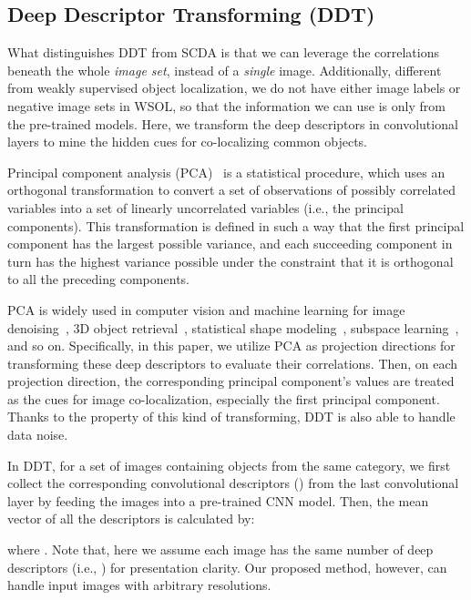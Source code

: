 \documentclass[twocolumn]{svjour3}          \smartqed  \usepackage{graphicx}
\begin{document}
\subsection{Deep Descriptor Transforming (DDT)}

What distinguishes DDT from SCDA is that we can leverage the correlations beneath the whole \emph{image set}, instead of a \emph{single} image. Additionally, different from weakly supervised object localization, we do not have either image labels or negative image sets in WSOL, so that the information we can use is only from the pre-trained models. Here, we transform the deep descriptors in convolutional layers to mine the hidden cues for co-localizing common objects.

Principal component analysis (PCA)~\citep{pca1901} is a statistical procedure, which uses an orthogonal transformation to convert a set of observations of possibly correlated variables into a set of linearly uncorrelated variables (i.e., the principal components). This transformation is defined in such a way that the first principal component has the largest possible variance, and each succeeding component in turn has the highest variance possible under the constraint that it is orthogonal to all the preceding components.

PCA is widely used in computer vision and machine learning for image denoising~\citep{stereijcv2017}, 3D object retrieval~\citep{3dijcv2011}, statistical shape modeling~\citep{shellpcaiccv2015}, subspace learning~\citep{videosubsijcv2013,subsijcv2003}, and so on. Specifically, in this paper, we utilize PCA as projection directions for transforming these deep descriptors  to evaluate their correlations. Then, on each projection direction, the corresponding principal component's values are treated as the cues for image co-localization, especially the first principal component. Thanks to the property of this kind of transforming, DDT is also able to handle data noise.

In DDT, for a set of  images containing objects from the same category, we first collect the corresponding convolutional descriptors () from the last convolutional layer by feeding the images into a pre-trained CNN model. Then, the mean vector of all the descriptors is calculated by:

where . Note that, here we assume each image has the same number of deep descriptors (i.e., ) for presentation clarity. Our proposed method, however, can handle input images with arbitrary resolutions.
\end{document}
